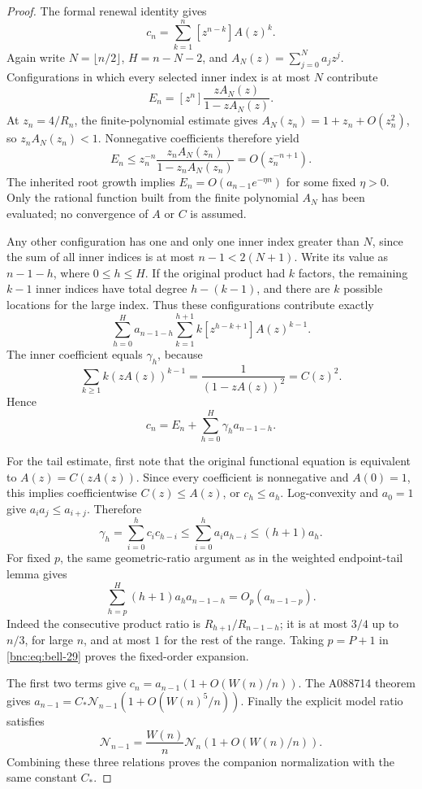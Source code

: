 \documentclass[11pt]{article}
\numberwithin{equation}{section}
\theoremstyle{definition}
\theoremstyle{remark}
\begin{document}
\begin{proof}
The formal renewal identity gives
\[
 c_n=\sum_{k=1}^{n}[z^{n-k}]A(z)^k.
\]
Again write \(N=\lfloor n/2\rfloor\), \(H=n-N-2\), and
\(A_N(z)=\sum_{j=0}^{N}a_jz^j\).
Configurations in which every selected inner index is at most \(N\)
contribute
\[
 E_n=[z^n]\frac{zA_N(z)}{1-zA_N(z)}.
\]
At \(z_n=4/R_n\), the finite-polynomial estimate gives
\(A_N(z_n)=1+z_n+O(z_n^2)\), so \(z_nA_N(z_n)<1\).
Nonnegative coefficients therefore yield
\[
 E_n\le z_n^{-n}
       \frac{z_nA_N(z_n)}{1-z_nA_N(z_n)}
       =O(z_n^{-n+1}).
\]
The inherited root growth implies
\(E_n=O(a_{n-1}e^{-\eta n})\) for some fixed \(\eta>0\).
Only the rational function built from the finite polynomial \(A_N\)
has been evaluated; no convergence of \(A\) or \(C\) is assumed.

Any other configuration has one and only one inner index greater than
\(N\), since the sum of all inner indices is at most \(n-1<2(N+1)\).
Write its value as \(n-1-h\), where \(0\le h\le H\).
If the original product had \(k\) factors, the remaining \(k-1\)
inner indices have total degree \(h-(k-1)\), and there are \(k\)
possible locations for the large index.
Thus these configurations contribute exactly
\[
 \sum_{h=0}^{H}a_{n-1-h}
       \sum_{k=1}^{h+1} k[z^{h-k+1}]A(z)^{k-1}.
\]
The inner coefficient equals \(\gamma_h\), because
\[
 \sum_{k\ge1} k(zA(z))^{k-1}
       =\frac1{(1-zA(z))^2}=C(z)^2.
\]
Hence
\begin{equation}\label{bnc:eq:bell-29}
c_n=E_n+\sum_{h=0}^{H}\gamma_h a_{n-1-h}.
\end{equation}

For the tail estimate, first note that the original functional equation
is equivalent to \(A(z)=C(zA(z))\).
Since every coefficient is nonnegative and \(A(0)=1\), this implies
coefficientwise \(C(z)\le A(z)\), or \(c_h\le a_h\).
Log-convexity and \(a_0=1\) give \(a_i a_j\le a_{i+j}\).
Therefore
\[
 \gamma_h=\sum_{i=0}^{h}c_i c_{h-i}
       \le\sum_{i=0}^{h}a_i a_{h-i}
       \le(h+1)a_h.
\]
For fixed \(p\), the same geometric-ratio argument as in the
weighted endpoint-tail lemma gives
\[
 \sum_{h=p}^{H}(h+1)a_h a_{n-1-h}
       =O_p(a_{n-1-p}).
\]
Indeed the consecutive product ratio is
\(R_{h+1}/R_{n-1-h}\); it is at most \(3/4\) up to \(n/3\),
for large \(n\), and at most \(1\) for the rest of the range.
Taking \(p=P+1\) in \eqref{bnc:eq:bell-29} proves the fixed-order expansion.

The first two terms give
\(c_n=a_{n-1}(1+O(W(n)/n))\).
The A088714 theorem gives
\(a_{n-1}=C_*\mathcal N_{n-1}(1+O(W(n)^5/n))\).
Finally the explicit model ratio satisfies
\[
 \mathcal N_{n-1}
   =\frac{W(n)}{n}\mathcal N_n
      (1+O(W(n)/n)).
\]
Combining these three relations proves the companion normalization with
the same constant \(C_*\).
\end{proof}
\end{document}
